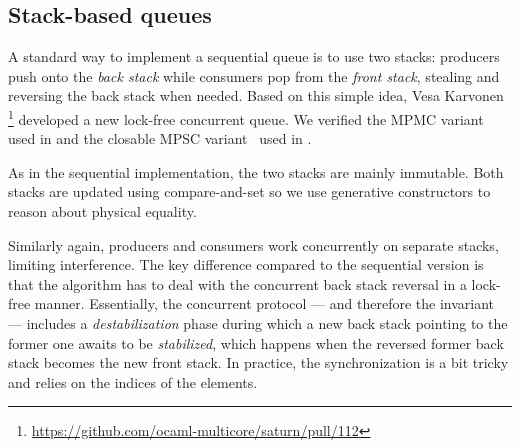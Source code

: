 \subsection{Stack-based queues}

A standard way to implement a sequential queue is to use two stacks: producers push onto the \emph{back stack} while consumers pop from the \emph{front stack}, stealing and reversing the back stack when needed.
Based on this simple idea, Vesa Karvonen%
\footnote{
\url{https://github.com/ocaml-multicore/saturn/pull/112}
}
developed a new lock-free concurrent queue.
We verified the MPMC variant~ used in \Picos and the closable MPSC variant~ used in \Eio.

As in the sequential implementation, the two stacks are mainly immutable.
Both stacks are updated using compare-and-set so we use generative constructors to reason about physical equality.

Similarly again, producers and consumers work concurrently on separate stacks, limiting interference.
The key difference compared to the sequential version is that the algorithm has to deal with the concurrent back stack reversal in a lock-free manner.
Essentially, the concurrent protocol --- and therefore the \Iris invariant --- includes a \emph{destabilization} phase during which a new back stack pointing to the former one awaits to be \emph{stabilized}, which happens when the reversed former back stack becomes the new front stack.
In practice, the synchronization is a bit tricky and relies on the indices of the elements.

